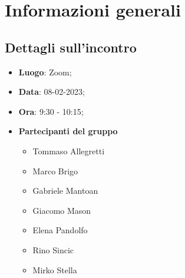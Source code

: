 \section{Informazioni generali}

\subsection{Dettagli sull'incontro}
\begin{itemize}
    \item \textbf{Luogo}: Zoom;
    \item \textbf{Data}: 08-02-2023;
    \item \textbf{Ora}: 9:30 - 10:15;
    \item \textbf{Partecipanti del gruppo}
        \begin{itemize}
            \item Tommaso Allegretti
            \item Marco Brigo
            \item Gabriele Mantoan
            \item Giacomo Mason
            \item Elena Pandolfo
            \item Rino Sincic
            \item Mirko Stella
        \end{itemize}
\end{itemize}

